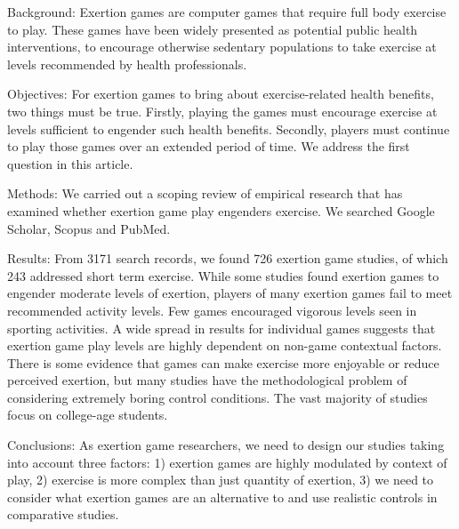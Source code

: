 Background: Exertion games are computer games that require full body exercise to play. These games have been widely presented as potential public health interventions, to encourage otherwise sedentary populations to take exercise at levels recommended by health professionals. 

Objectives: For exertion games to bring about exercise-related health benefits, two things must be true. Firstly, playing the games must encourage exercise at levels sufficient to engender such health benefits. Secondly, players must continue to play those games over an extended period of time. We address the first question in this article.

Methods: We carried out a scoping review of empirical research that has examined whether exertion game play engenders exercise. We searched Google Scholar, Scopus and PubMed.

Results: From 3171 search records, we found 726 exertion game studies, of which 243 addressed short term exercise. While some studies found exertion games to engender moderate levels of exertion, players of many exertion games fail to meet recommended activity levels. Few games encouraged vigorous levels seen in sporting activities. A wide spread in results for individual games suggests that exertion game play levels are highly dependent on non-game contextual factors. There is some evidence that games can make exercise more enjoyable or reduce perceived exertion, but many studies have the methodological problem of considering extremely boring control conditions. The vast majority of studies focus on college-age students.

Conclusions: As exertion game researchers, we need to design our studies taking into account three factors: 1) exertion games are highly modulated by context of play, 2) exercise is more complex than just quantity of exertion, 3) we need to consider what exertion games are an alternative to and use realistic controls in comparative studies.
